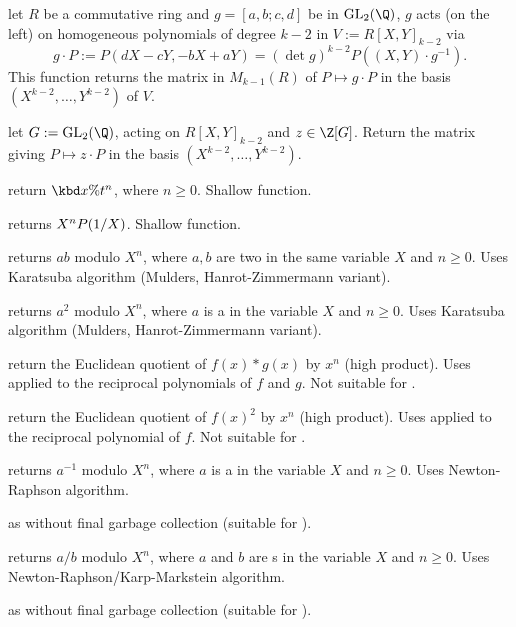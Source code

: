  let $R$ be a commutative ring
and $g = [a,b;c,d]$ be in $\text{GL}_2(\Q)$, $g$ acts (on the left)
on homogeneous polynomials of degree $k-2$ in $V := R[X,Y]_{k-2}$ via
$$ g\cdot P := P(dX-cY, -bX+aY) = (\det g)^{k-2} P((X,Y)\cdot g^{-1}).$$
This function returns the matrix in $M_{k-1}(R)$ of $P\mapsto g\cdot P$ in
the basis $(X^{k-2},\dots,Y^{k-2})$ of $V$.

 let $G:=\text{GL}_2(\Q)$, acting
on $R[X,Y]_{k-2}$ and $z\in \Z[G]$. Return the matrix giving
$P\mapsto z\cdot P$ in the basis $(X^{k-2},\dots,Y^{k-2})$.


 return $\kbd{x \% } t^n$,
where $n\geq 0$. Shallow function.

 returns $X^n\*P(1/X)$. Shallow function.

 returns $a b$ modulo $X^n$,
where $a,b$ are two  in the same variable $X$ and $n \geq 0$. Uses
Karatsuba algorithm (Mulders, Hanrot-Zimmermann variant).

 returns $a^2$ modulo $X^n$,
where $a$ is a  in the variable $X$ and $n \geq 0$. Uses
Karatsuba algorithm (Mulders, Hanrot-Zimmermann variant).

 return the Euclidean quotient
of $f(x)*g(x)$ by $x^n$ (high product). Uses  applied to
the reciprocal polynomials of $f$ and $g$. Not suitable for .

 return the Euclidean quotient
of $f(x)^2$ by $x^n$ (high product). Uses  applied to
the reciprocal polynomial of $f$. Not suitable for .

 returns $a^{-1}$ modulo $X^n$,
where $a$ is a  in the variable $X$ and $n \geq 0$. Uses
Newton-Raphson algorithm.

 as  without final garbage
collection (suitable for ).

 returns $a/b$ modulo $X^n$,
where $a$ and $b$ are s in the variable $X$ and $n \geq 0$. Uses
Newton-Raphson/Karp-Markstein algorithm.

 as  without final garbage
collection (suitable for ).

